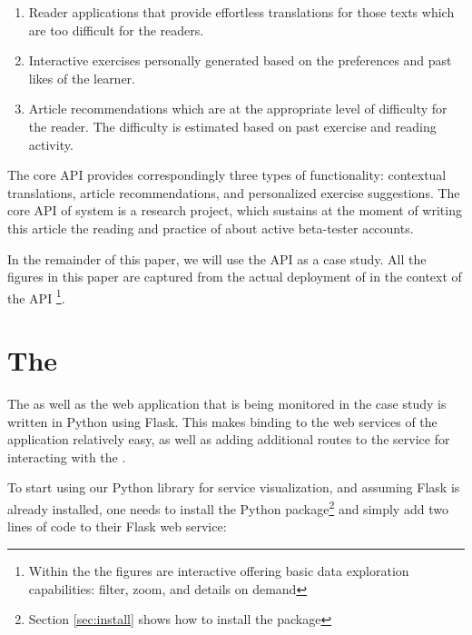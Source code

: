 \documentclass[conference]{IEEEtran}
\begin{document}
  \begin{enumerate}

    \item Reader applications that provide effortless translations for those texts which are too difficult for the readers.

    \item Interactive exercises personally generated based on the preferences and past likes of the learner.

    \item Article recommendations which are at the appropriate level of difficulty for the reader. The difficulty is estimated based on past exercise and reading activity.

  \end{enumerate}

  The core API provides correspondingly three types of functionality: contextual translations, article recommendations, and personalized exercise suggestions. The core API of system is a research project, which sustains at the moment of writing this article the reading and practice of about \activeUserCount active beta-tester accounts. 

  In the remainder of this paper, we will use the \zee API as a case study. All the figures in this paper are captured from the actual deployment of \tool in the context of the \zee API \footnote{Within the \tool the figures are interactive offering basic data exploration capabilities: filter, zoom, and details on demand\cite{Shne99a}}.





\section{The \tool}

  The \tool as well as the web application that is being monitored in the case study is written in Python using Flask. This makes binding to the web services of the application relatively easy, as well as adding additional routes to the service for interacting with the \tool.

  To start using our Python library for service visualization, and assuming Flask is already installed, one needs to install the Python package\footnote{Section \ref{sec:install} shows how to install the package} 
  and simply add two lines of code to their Flask web service:
\end{document}
